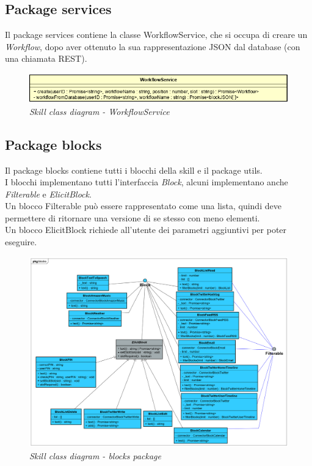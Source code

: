 \subsection{Package services}
Il package services contiene la classe WorkflowService, che si occupa di creare un \textit{Workflow}, dopo aver ottenuto la sua rappresentazione JSON dal database (con una chiamata REST).
\begin{figure} [h]
    \centering
	\includegraphics[scale=0.7]{./images/WorkflowService.PNG}
	\caption{\textit{Skill class diagram - WorkflowService}}\label{classlambda}
\end{figure}
\clearpage
\subsection{Package blocks}
Il package blocks contiene tutti i blocchi della skill e il package utils.\\
I blocchi implementano tutti l'interfaccia \textit{Block}, alcuni implementano anche \textit{Filterable} e \textit{ElicitBlock}.\\
Un blocco Filterable può essere rappresentato come una lista, quindi deve permettere di ritornare una versione di se stesso con meno elementi.\\
Un blocco ElicitBlock richiede all'utente dei parametri aggiuntivi per poter eseguire.
\begin{figure} [h]
    \centering
	\includegraphics[scale=0.24]{./images/ZeroSevenClassBlocks.png}
	\caption{\textit{Skill class diagram - blocks package}}\label{classlambda}
\end{figure}
